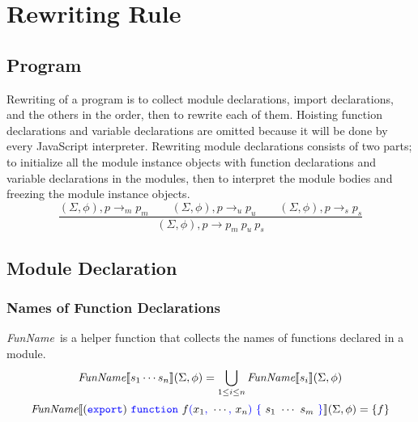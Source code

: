 \documentclass[a4paper]{article}
\newcommand{\code}[1]{\textcolor{blue}{\tt #1}}
\newcommand{\FunName}{\emph{FunName}}
\begin{document}
\section{Rewriting Rule}
\subsection{Program}
Rewriting of a program is to collect module declarations, import declarations, and the others in the order, then to rewrite each of them. Hoisting function declarations and variable declarations are omitted because it will be done by every JavaScript interpreter. Rewriting module declarations consists of two parts; to initialize all the module instance objects with function declarations and variable declarations in the modules, then to interpret the module bodies and freezing the module instance objects.
\begin{equation*}
\frac{(\Sigma, \phi), p \rightarrow_m p_m \qquad (\Sigma, \phi), p \rightarrow_u p_u \qquad (\Sigma, \phi), p \rightarrow_s p_s}{(\Sigma, \phi), p \rightarrow p_m\ p_u\ p_s}
\end{equation*}

\subsection{Module Declaration}
\subsubsection{Names of Function Declarations}
\FunName\ is a helper function that collects the names of functions declared in a module.
\begin{equation*}
\FunName \llbracket s_1 \cdots s_n \rrbracket (\Sigma, \phi) = \bigcup_{1 \le i \le n} \FunName \llbracket s_i \rrbracket (\Sigma, \phi)
\end{equation*}
\begin{equation*}
\FunName \llbracket (\code{export})\ \code{function}\ f\code{(}x_1\code{,}\ \cdots\code{,}\ x_n\code{)}\ \code{\{}\ s_1\ \cdots\ s_m\ \code{\}} \rrbracket (\Sigma, \phi) = \{ f \}
\end{equation*}
\end{document}
